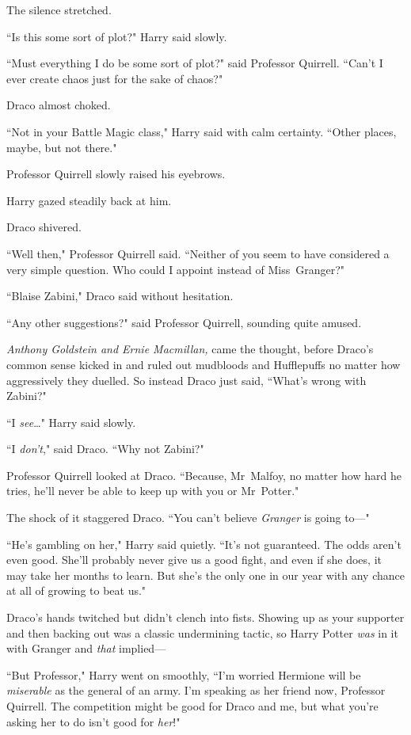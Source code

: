 The silence stretched.

``Is this some sort of plot?" Harry said slowly.

``Must everything I do be some sort of plot?" said Professor Quirrell. ``Can't I ever create chaos just for the sake of chaos?"

Draco almost choked.

``Not in your Battle Magic class," Harry said with calm certainty. ``Other places, maybe, but not there."

Professor Quirrell slowly raised his eyebrows.

Harry gazed steadily back at him.

Draco shivered.

``Well then," Professor Quirrell said. ``Neither of you seem to have considered a very simple question. Who could I appoint instead of Miss~Granger?"

``Blaise Zabini," Draco said without hesitation.

``Any other suggestions?" said Professor Quirrell, sounding quite amused.

\emph{Anthony Goldstein and Ernie Macmillan,} came the thought, before Draco's common sense kicked in and ruled out mudbloods and Hufflepuffs no matter how aggressively they duelled. So instead Draco just said, ``What's wrong with Zabini?"

``I \emph{see}{\ldots}" Harry said slowly.

``I \emph{don't}," said Draco. ``Why not Zabini?"

Professor Quirrell looked at Draco. ``Because, Mr~Malfoy, no matter how hard he tries, he'll never be able to keep up with you or Mr~Potter."

The shock of it staggered Draco. ``You can't believe \emph{Granger} is going to—"

``He's gambling on her," Harry said quietly. ``It's not guaranteed. The odds aren't even good. She'll probably never give us a good fight, and even if she does, it may take her months to learn. But she's the only one in our year with any chance at all of growing to beat us."

Draco's hands twitched but didn't clench into fists. Showing up as your supporter and then backing out was a classic undermining tactic, so Harry Potter \emph{was} in it with Granger and \emph{that} implied—

``But Professor," Harry went on smoothly, ``I'm worried Hermione will be \emph{miserable} as the general of an army. I'm speaking as her friend now, Professor Quirrell. The competition might be good for Draco and me, but what you're asking her to do isn't good for \emph{her}!"

